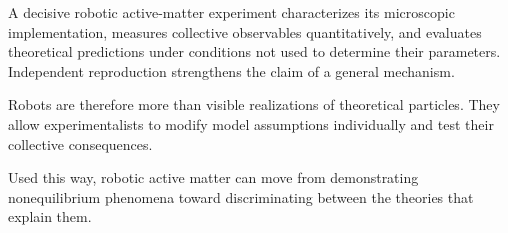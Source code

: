 A decisive robotic active-matter
experiment characterizes its
microscopic implementation,
measures collective observables
quantitatively, and evaluates
theoretical predictions under
conditions not used to determine
their parameters. Independent
reproduction strengthens the
claim of a general mechanism.

Robots are therefore more than
visible realizations of theoretical
particles. They allow experimentalists
to modify model assumptions
individually and test their
collective consequences.

Used this way, robotic active
matter can move from demonstrating
nonequilibrium phenomena toward
discriminating between the
theories that explain them.

